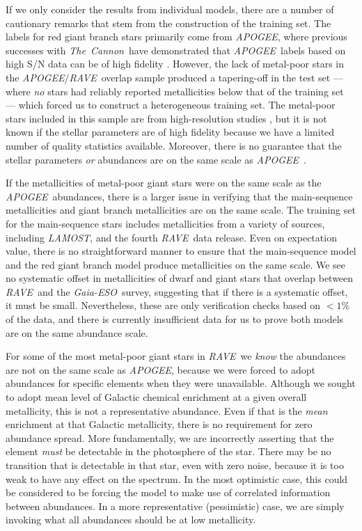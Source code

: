\documentclass[preprint]{aastex}
\newcommand{\acronym}[1]{{\small{#1}}}
\newcommand{\project}[1]{\textsl{#1}}
\newcommand{\thecannon}{\project{The~Cannon}}
\newcommand{\rave}{\project{\acronym{RAVE}}}
\newcommand{\ges}{\project{Gaia-ESO}}
\newcommand{\apogee}{\project{\acronym{APOGEE}}}
\newcommand{\lamost}{\project{\acronym{LAMOST}}}
\begin{document}
If we only consider the results from individual models, there are a number of cautionary
remarks that stem from the construction of the training set.  The labels for red giant 
branch stars primarily come from \apogee, where previous successes with \thecannon\
have demonstrated that \apogee\ labels based on high S/N data can be of high fidelity
\citep{Ness_2015,Ness_2016,Ho_2016,Casey_2016b}.
However, the lack of metal-poor stars in the \apogee/\rave\ overlap sample produced
a tapering-off in the test set --- where \emph{no} stars had reliably reported metallicities
below that of the training set --- which forced us to construct a heterogeneous training
set.  The metal-poor stars included in this sample are from high-resolution studies
\citep{Fulbright_2010,Ruchti_2011}, but it is not known if the stellar parameters are
of high fidelity because we have a limited number of quality statistics available. 
Moreover, there is no guarantee that the stellar parameters \emph{or} abundances are 
on the same scale as \apogee\ \citep[and good reasons to believe they will not be; see][]{Smiljanic_2014}.


If the metallicities of metal-poor giant stars were on the same scale as the \apogee\
abundances, there is a larger issue in verifying that the main-sequence metallicities
and giant branch metallicities are on the same scale.  The training set for the
main-sequence stars includes metallicities from a variety of sources, including
\lamost, and the fourth \rave\ data release.  Even on expectation value, there is 
no straightforward manner to ensure that the main-sequence model and the red giant
branch model produce metallicities on the same scale.  We see no systematic offset
in metallicities of dwarf and giant stars that overlap between \rave\ and the \ges\
survey, suggesting that if there is a systematic offset, it must be small. 
Nevertheless, these are only verification checks based on $<1$\% of the data, and 
there is currently insufficient data for us to prove both models are on the same 
abundance scale.


For some of the most metal-poor giant stars in \rave\, we \emph{know} the abundances 
are not on the same scale as \apogee, because we were forced to adopt abundances for 
specific elements when they were unavailable.  Although we sought to adopt mean
level of Galactic chemical enrichment at a given overall metallicity, this is not a
representative abundance. Even if that is the \emph{mean} enrichment at that Galactic
metallicity, there is no requirement for zero abundance spread.  More fundamentally, 
we are incorrectly asserting that the element \emph{must} be detectable in the 
photosphere of the star.  There may be no transition that is detectable in that 
star, even with zero noise, because it is too weak to have any effect on the 
spectrum.  In the most optimistic case, this could be considered to be forcing the
model to make use of correlated information between abundances.  In a more 
representative (pessimistic) case, we are simply invoking what all abundances should 
be at low metallicity.
\end{document}
